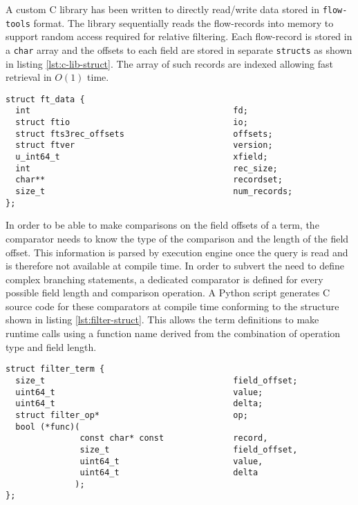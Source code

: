 A custom C library has been written to directly read/write data stored in
\texttt{flow-tools} format. The library sequentially reads the flow-records
into memory to support random access required for relative filtering. Each
flow-record is stored in a \texttt{char} array and the offsets to each field
are stored in separate \texttt{structs} as shown in listing
\ref{lst:c-lib-struct}. The array of such records are indexed allowing fast
retrieval in $O(1)$ time.

\begin{lstlisting}
struct ft_data {
  int                                         fd;
  struct ftio                                 io;
  struct fts3rec_offsets                      offsets;
  struct ftver                                version;
  u_int64_t                                   xfield;
  int                                         rec_size;
  char**                                      recordset;
  size_t                                      num_records;
};
\end{lstlisting}

In order to be able to make comparisons on the field offsets of a term, the
comparator needs to know the type of the comparison and the length of the
field offset. This information is parsed by execution engine once the query is
read and is therefore not available at compile time.  In order to subvert the
need to define complex branching statements, a dedicated comparator is defined
for every possible field length and comparison operation. A Python script
generates C source code for these comparators at compile time conforming to
the structure shown in listing \ref{lst:filter-struct}. This allows the term
definitions to make runtime calls using a function name derived from the
combination of operation type and field length.

\begin{lstlisting}
struct filter_term {
  size_t                                      field_offset;
  uint64_t                                    value;
  uint64_t                                    delta;
  struct filter_op*                           op;
  bool (*func)(
               const char* const              record,
               size_t                         field_offset,
               uint64_t                       value,
               uint64_t                       delta
              );
};
\end{lstlisting}

